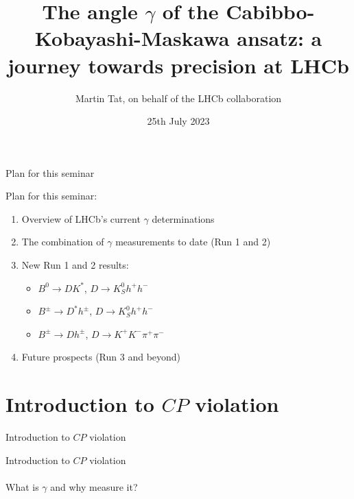 \documentclass[dvipsnames]{beamer}
\title[CERN LHC seminar]{The angle $\gamma$ of the Cabibbo-Kobayashi-Maskawa ansatz: a journey towards precision at LHCb}
\author[Martin Tat]{Martin Tat, on behalf of the LHCb collaboration}
\institute[University of Oxford]{\normalsize University of Oxford\\ \vspace{0.3cm}\normalsize CERN LHC seminar}
\date{25th July 2023}
\begin{document}
\begin{frame}
  \titlepage
\end{frame}


\begin{frame}{Plan for this seminar}
  \begin{center}
    {\Large Plan for this seminar:}
  \end{center}
  \vspace{0.2cm}
  \begin{enumerate}
    \setlength\itemsep{1.0em}
    \item{Overview of LHCb's current $\gamma$ determinations}
    \item{The combination of $\gamma$ measurements to date (Run 1 and 2)}
    \item{New Run 1 and 2 results:}
    \begin{itemize}
      \item{$B^0\to DK^*$, $D\to K_S^0h^+h^-$}
      \item{$B^\pm\to D^*h^\pm$, $D\to K_S^0h^+h^-$}
      \item{$B^\pm\to Dh^\pm$, $D\to K^+K^-\pi^+\pi^-$}
    \end{itemize}
    \item{Future prospects (Run 3 and beyond)}
  \end{enumerate}
\end{frame}

\section{Introduction to \texorpdfstring{$C\!P$}{CP} violation}
\begin{frame}{Introduction to $C\!P$ violation}
  \begin{center}
    {\huge Introduction to $C\!P$ violation} \\~\\
    {\large What is $\gamma$ and why measure it?}
  \end{center}
\end{frame}
\end{document}
